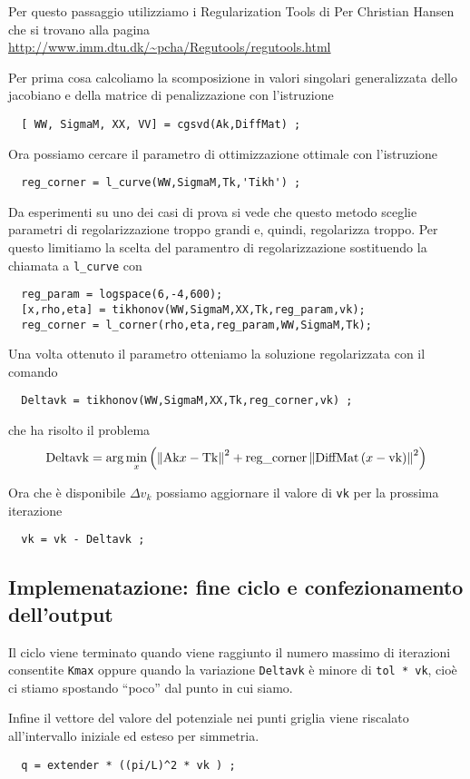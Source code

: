 \documentclass[a4paper,10pt]{article}
\theoremstyle{plain}
\theoremstyle{definition}
\theoremstyle{remark}
\newcommand{\pa}[1]{\left(#1\right)}
\newcommand{\norm}[1]{\left\|#1\right\|}
\begin{document}
Per questo passaggio utilizziamo i Regularization Tools di Per
Christian Hansen che si trovano alla pagina
\url{http://www.imm.dtu.dk/~pcha/Regutools/regutools.html}

Per prima cosa calcoliamo la scomposizione in valori singolari
generalizzata dello jacobiano e della matrice di penalizzazione con
l'istruzione
\begin{lstlisting}
  [ WW, SigmaM, XX, VV] = cgsvd(Ak,DiffMat) ;
\end{lstlisting}

Ora possiamo cercare il parametro di ottimizzazione ottimale con
l'istruzione
\begin{lstlisting}
  reg_corner = l_curve(WW,SigmaM,Tk,'Tikh') ;
\end{lstlisting}

Da esperimenti su uno dei casi di prova si vede che questo metodo
sceglie parametri di regolarizzazione troppo grandi e, quindi,
regolarizza troppo. Per questo limitiamo la scelta del paramentro di
regolarizzazione sostituendo la chiamata a \lstinline{l_curve} con
\begin{lstlisting}
  reg_param = logspace(6,-4,600);
  [x,rho,eta] = tikhonov(WW,SigmaM,XX,Tk,reg_param,vk);
  reg_corner = l_corner(rho,eta,reg_param,WW,SigmaM,Tk);
\end{lstlisting}

Una volta ottenuto il parametro otteniamo la soluzione regolarizzata
con il comando
\begin{lstlisting}
  Deltavk = tikhonov(WW,SigmaM,XX,Tk,reg_corner,vk) ;
\end{lstlisting}
che ha risolto il problema
\[
\lstinline{Deltavk} = \arg\min _{x} \pa{ \norm{\lstinline{Ak}x -
    \lstinline{Tk}} ^2 + \lstinline{reg_corner}
  \norm{\lstinline{DiffMat} \pa{ x - \lstinline{vk}}}^2 }
\]

Ora che è disponibile $\Delta v_k$ possiamo aggiornare il valore di
\lstinline{vk} per la prossima iterazione
\begin{lstlisting}
  vk = vk - Deltavk ;
\end{lstlisting}

\subsection{Implemenatazione: fine ciclo e confezionamento dell'output}

Il ciclo viene terminato quando viene raggiunto il numero massimo di
iterazioni consentite \lstinline{Kmax} oppure quando la variazione
\lstinline{Deltavk} è minore di \lstinline{tol * vk}, cioè ci stiamo
spostando ``poco'' dal punto in cui siamo.

Infine il vettore del valore del potenziale nei punti griglia viene
riscalato all'intervallo iniziale ed esteso per simmetria.
\begin{lstlisting}
  q = extender * ((pi/L)^2 * vk ) ;
\end{lstlisting}
\end{document}
